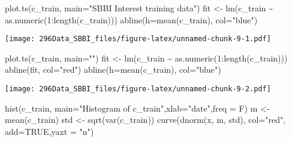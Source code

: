\documentclass[
]{article}
\newenvironment{Shaded}{\begin{snugshade}}{\end{snugshade}}
\newcommand{\AttributeTok}[1]{\textcolor[rgb]{0.77,0.63,0.00}{#1}}
\newcommand{\ConstantTok}[1]{\textcolor[rgb]{0.00,0.00,0.00}{#1}}
\newcommand{\DecValTok}[1]{\textcolor[rgb]{0.00,0.00,0.81}{#1}}
\newcommand{\FunctionTok}[1]{\textcolor[rgb]{0.00,0.00,0.00}{#1}}
\newcommand{\NormalTok}[1]{#1}
\newcommand{\OtherTok}[1]{\textcolor[rgb]{0.56,0.35,0.01}{#1}}
\newcommand{\SpecialCharTok}[1]{\textcolor[rgb]{0.00,0.00,0.00}{#1}}
\newcommand{\StringTok}[1]{\textcolor[rgb]{0.31,0.60,0.02}{#1}}
\begin{document}
\begin{Shaded}
\begin{Highlighting}[]
\FunctionTok{plot.ts}\NormalTok{(c\_train, }\AttributeTok{main=}\StringTok{"SBBI Interest training data"}\NormalTok{) }
\NormalTok{fit }\OtherTok{\textless{}{-}} \FunctionTok{lm}\NormalTok{(c\_train }\SpecialCharTok{\textasciitilde{}} \FunctionTok{as.numeric}\NormalTok{(}\DecValTok{1}\SpecialCharTok{:}\FunctionTok{length}\NormalTok{(c\_train)))}
\FunctionTok{abline}\NormalTok{(}\AttributeTok{h=}\FunctionTok{mean}\NormalTok{(c\_train), }\AttributeTok{col=}\StringTok{"blue"}\NormalTok{)}
\end{Highlighting}
\end{Shaded}

\texttt{[image: 296Data\_SBBI\_files/figure-latex/unnamed-chunk-9-1.pdf]}

\begin{Shaded}
\begin{Highlighting}[]
\FunctionTok{plot.ts}\NormalTok{(c\_train, }\AttributeTok{main=}\StringTok{""}\NormalTok{)}
\NormalTok{fit }\OtherTok{\textless{}{-}} \FunctionTok{lm}\NormalTok{(c\_train }\SpecialCharTok{\textasciitilde{}} \FunctionTok{as.numeric}\NormalTok{(}\DecValTok{1}\SpecialCharTok{:}\FunctionTok{length}\NormalTok{(c\_train)))}
\FunctionTok{abline}\NormalTok{(fit, }\AttributeTok{col=}\StringTok{"red"}\NormalTok{)}
\FunctionTok{abline}\NormalTok{(}\AttributeTok{h=}\FunctionTok{mean}\NormalTok{(c\_train), }\AttributeTok{col=}\StringTok{"blue"}\NormalTok{)}
\end{Highlighting}
\end{Shaded}

\texttt{[image: 296Data\_SBBI\_files/figure-latex/unnamed-chunk-9-2.pdf]}

\begin{Shaded}
\begin{Highlighting}[]
\FunctionTok{hist}\NormalTok{(c\_train, }\AttributeTok{main=}\StringTok{"Histogram of c\_train"}\NormalTok{,}\AttributeTok{xlab=}\StringTok{"date"}\NormalTok{,}\AttributeTok{freq =}\NormalTok{ F)}
\NormalTok{m }\OtherTok{\textless{}{-}} \FunctionTok{mean}\NormalTok{(c\_train)}
\NormalTok{std }\OtherTok{\textless{}{-}} \FunctionTok{sqrt}\NormalTok{(}\FunctionTok{var}\NormalTok{(c\_train))}
\FunctionTok{curve}\NormalTok{(}\FunctionTok{dnorm}\NormalTok{(x, m, std), }\AttributeTok{col=}\StringTok{"red"}\NormalTok{, }\AttributeTok{add=}\ConstantTok{TRUE}\NormalTok{,}\AttributeTok{yaxt =} \StringTok{"n"}\NormalTok{)}
\end{Highlighting}
\end{Shaded}
\end{document}
